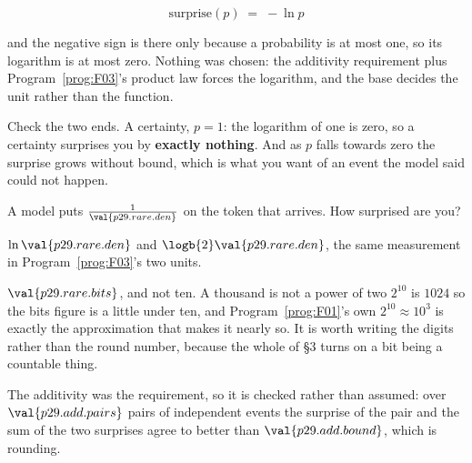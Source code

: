 \begin{fr}

\[ \text{surprise}(p) \;=\; -\ln p \]

and the negative sign is there only because a probability is at most one, so
its logarithm is at most zero. Nothing was chosen: the additivity requirement
plus Program~\ref{prog:F03}'s product law forces the logarithm, and the base
decides the unit rather than the function.

Check the two ends. A certainty, $p = 1$: the logarithm of one is zero, so a
certainty surprises you by \textbf{exactly nothing}. And as $p$ falls towards
zero the surprise grows without bound, which is what you want of an event the
model said could not happen.

A model puts $\frac{1}{\val{p29.rare.den}}$ on the token that arrives. How
surprised are you?
\dotline
\nextframe
\end{fr}

\begin{fr}

$\ln \val{p29.rare.den}$ and $\logb{2} \val{p29.rare.den}$, the same
measurement in Program~\ref{prog:F03}'s two units.

\begin{note}
$\val{p29.rare.bits}$, and not ten. A thousand is not a power of two \dash{}
$2^{10}$ is $1024$ \dash{} so the bits figure is a little under ten, and
Program~\ref{prog:F01}'s own $2^{10} \approx 10^{3}$ is exactly the
approximation that makes it nearly so. It is worth writing the digits rather
than the round number, because the whole of §3 turns on a bit being a
countable thing.
\end{note}

The additivity was the requirement, so it is checked rather than assumed: over
$\val{p29.add.pairs}$ pairs of independent events the surprise of the pair and
the sum of the two surprises agree to better than
$\val{p29.add.bound}$, which is rounding.

\end{fr}

